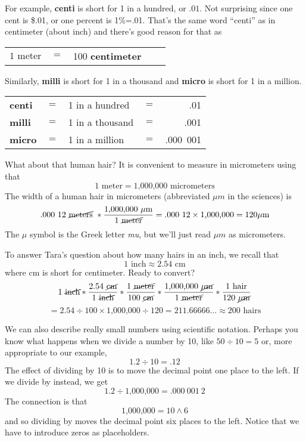 For example, \textbf{centi} is short for 1 in a hundred, or $.01$.  Not surprising since one cent is \$.01, or one percent is 1\%=.01.  That's the same word ``centi'' as in centimeter (about  inch) and there's good reason for that as
\begin{center}
\begin{tabular} {lclcr} 
$ \text{1 meter}$&$=$&100 \textbf{centimeter} \\
\end{tabular}
\end{center}
Similarly, \textbf{milli} is short for 1 in a thousand and \textbf{micro} is short for 1 in a million.
\begin{center}
\begin{tabular} {lclcr} 
\textbf{centi} &$=$&1 in a hundred &$=$&.01\\
\textbf{milli} &$=$&1 in a thousand &$=$&.001\\
\textbf{micro} &$=$&1 in a million &$=$&.000~001\\
\end{tabular}
\end{center}


What about that human hair?  It is convenient to measure in micrometers
using that $$1 \text{ meter} = \text{1,000,000 micrometers} $$
The width of a human hair in micrometers (abbreviated $\mu m$ in the sciences) is
$$.000~12 \text{ \cancel{meters} } \ast \frac{\text{1,000,000 } \mu \text{m}}{1 \text{ \cancel{meter}}} =  .000~12 \times \text{1,000,000} = 120 \mu \text{m}$$
The $\mu$ symbol is the Greek letter {\it mu}, but we'll just read $\mu m$ as micrometers.  

To answer Tara's question about how many hairs in an inch, we recall that 
$$1 \text{ inch} \approx 2.54 \text{ cm}$$
where cm is short for centimeter.  Ready to convert?
$$ 1 \text{ \cancel{inch}} \ast \frac{ 2.54 \text{ \cancel{cm}} }{1 \text{ \cancel{inch}}}
\ast \frac{1 \text{ \cancel{meter}}}{100 \text{ \cancel{cm}}} 
\ast \frac{\text{1,000,000  \cancel{$\mu$m}}}{1 \text{ \cancel{meter}}} 
\ast \frac{1 \text{ hair}}{120 \text{ \cancel{$\mu$m}}}$$ 
$$ = 2.54 \div 100 \times \text{1,000,000} \div 120 = 211.66666\ldots \approx 200 \text{ hairs}$$

We can also describe really small numbers using scientific notation.  Perhaps you know what happens when we divide a number by 10, like
$ 50 \div 10 = 5$ or, more appropriate to our example, $$ 1.2 \div 10 = .12$$
The effect of dividing by 10 is to move the decimal point one place to the left.
If we divide by  instead, we get
$$ 1.2 \div \text{1,000,000} = .000~001~2 $$ 
The connection is that $$ \text{1,000,000} = 10 \wedge 6  $$
and so dividing by  moves the decimal point six places to the left.  Notice that we have to introduce zeros as placeholders.

